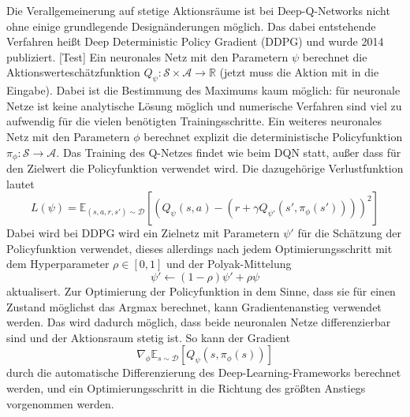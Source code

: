 Die Verallgemeinerung auf stetige Aktionsräume ist bei Deep-Q-Networks nicht ohne einige grundlegende Designänderungen möglich.
Das dabei entstehende Verfahren heißt Deep Deterministic Policy Gradient (DDPG) und wurde 2014 publiziert. [Test]
Ein neuronales Netz mit den Parametern $\psi$ berechnet die Aktionswerteschätzfunktion $Q_\psi: \mathcal{S} \times \mathcal{A}\rightarrow \mathbb{R}$ (jetzt muss die Aktion mit in die Eingabe).
Dabei ist die Bestimmung des Maximums kaum möglich: für neuronale Netze ist keine analytische Lösung möglich und numerische Verfahren sind viel zu aufwendig für die vielen benötigten Trainingsschritte.
Ein weiteres neuronales Netz mit den Parametern $\phi$ berechnet explizit die deterministische Policyfunktion $\pi_\phi: \mathcal{S} \rightarrow \mathcal{A}$.
Das Training des Q-Netzes findet wie beim DQN statt, außer dass für den Zielwert die Policyfunktion verwendet wird.
Die dazugehörige Verlustfunktion lautet 
\begin{equation}
    L(\psi) = \mathbb{E}_{(s, a, r, s')\sim\mathcal{D}}\left[\left(Q_\psi(s,a)-\left(r+\gamma Q_{\psi'}(s',\pi_\phi(s'))\right)\right)^2\right]
\end{equation}
Dabei wird bei DDPG wird ein Zielnetz mit Parametern $\psi'$ für die Schätzung der Policyfunktion verwendet, dieses allerdings nach jedem Optimierungsschritt mit dem Hyperparameter $\rho \in [0,1]$ und der Polyak-Mittelung
\begin{equation}
    \psi' \leftarrow (1 - \rho) \psi' + \rho \psi
\end{equation}
aktualisert.
Zur Optimierung der Policyfunktion in dem Sinne, dass sie für einen Zustand möglichst das Argmax berechnet, kann Gradientenanstieg verwendet werden.
Das wird dadurch möglich, dass beide neuronalen Netze differenzierbar sind und der Aktionsraum stetig ist.
So kann der Gradient
\begin{equation}
    \nabla_\phi \mathbb{E}_{s\sim\mathcal{D}}\left[Q_\psi(s, \pi_\phi(s))\right]
\end{equation}
durch die automatische Differenzierung des Deep-Learning-Frameworks berechnet werden, und ein Optimierungsschritt in die Richtung des größten Anstiegs vorgenommen werden.

